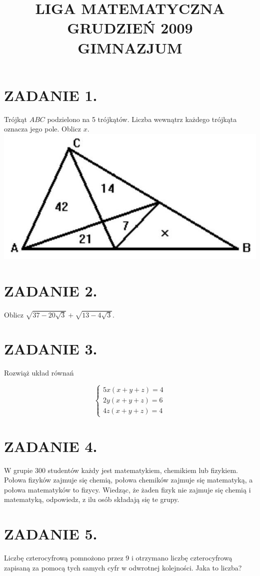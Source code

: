 \documentclass[10pt]{article}
\title{LIGA MATEMATYCZNA \\
 GRUDZIEŃ 2009 \\
 GIMNAZJUM }
\author{}
\date{}
\begin{document}
\maketitle
\section*{ZADANIE 1.}
Trójkąt \(A B C\) podzielono na 5 trójkątów. Liczba wewnątrz każdego trójkąta oznacza jego pole. Oblicz \(x\).\\
\includegraphics[max width=\textwidth, center]{2024_11_21_8382c39608adb6b5288cg-1}

\section*{ZADANIE 2.}
Oblicz \(\sqrt{37-20 \sqrt{3}}+\sqrt{13-4 \sqrt{3}}\).

\section*{ZADANIE 3.}
Rozwiąż układ równań

\[
\left\{\begin{array}{l}
5 x(x+y+z)=4 \\
2 y(x+y+z)=6 \\
4 z(x+y+z)=4
\end{array}\right.
\]

\section*{ZADANIE 4.}
W grupie 300 studentów każdy jest matematykiem, chemikiem lub fizykiem. Połowa fizyków zajmuje się chemią, połowa chemików zajmuje się matematyką, a połowa matematyków to fizycy. Wiedząc, że żaden fizyk nie zajmuje się chemią i matematyką, odpowiedz, z ilu osób składają się te grupy.

\section*{ZADANIE 5.}
Liczbę czterocyfrową pomnożono przez 9 i otrzymano liczbę czterocyfrową zapisaną za pomocą tych samych cyfr w odwrotnej kolejności. Jaka to liczba?
\end{document}
